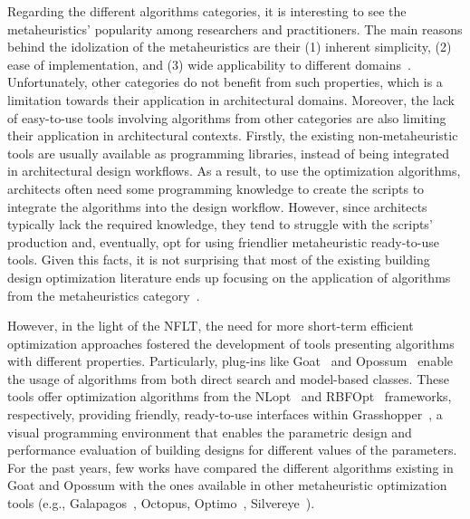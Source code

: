 	Regarding the different algorithms categories, it is interesting to see the metaheuristics' popularity among researchers and practitioners. The main reasons behind the idolization of the metaheuristics are their (1) inherent simplicity, (2) ease of implementation, and (3) wide applicability to different domains~\cite{Wortmann2017ADO}. Unfortunately, other categories do not benefit from such properties, which is a limitation towards their application in architectural domains. Moreover, the lack of easy-to-use tools involving algorithms from other categories are also limiting their application in architectural contexts. Firstly, the existing non-metaheuristic tools are usually available as programming libraries, instead of being integrated in architectural design workflows. As a result, to use the optimization algorithms, architects often need some programming knowledge to create the scripts to integrate the algorithms into the design workflow. However, since architects typically lack the required knowledge, they tend to struggle with the scripts' production and, eventually, opt for using friendlier metaheuristic ready-to-use tools. Given this facts, it is not surprising that most of the existing building design optimization literature ends up focusing on the application of algorithms from the metaheuristics category~\cite{Hamdy2016,Nguyen2014,Evins2013}. 
	
	However, in the light of the \ac{NFLT}, the need for more short-term efficient optimization approaches fostered the development of tools presenting algorithms with different properties. Particularly, plug-ins like Goat~\cite{GOAT} and Opossum~\cite{Wortmann2017Opossum} enable the usage of algorithms from both direct search and model-based classes. These tools offer optimization algorithms from the NLopt~\cite{NLOPT} and RBFOpt~\cite{RBFOPT} frameworks, respectively, providing friendly, ready-to-use interfaces within Grasshopper~\cite{GRASSHOPPER}, a visual programming environment that enables the parametric design and performance evaluation of building designs for different values of the parameters. For the past years, few works have compared the different algorithms existing in Goat and Opossum with the ones available in other metaheuristic optimization tools (e.g., Galapagos~\cite{GALAPAGOS}, Octopus\cite{OCTOPUS}, Optimo~\cite{OPTIMO}, Silvereye~\cite{Cichocka2017SILVEREYE}).
	
